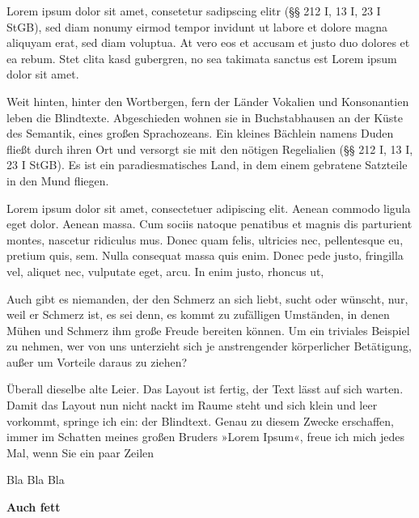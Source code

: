 \documentclass{jura}
\begin{document}
Lorem ipsum dolor sit amet, consetetur sadipscing elitr (§§ 212 I, 13 I, 23 I StGB), sed diam nonumy eirmod tempor invidunt ut labore et dolore magna aliquyam erat, sed diam voluptua. At vero eos et accusam et justo duo dolores et ea rebum. Stet clita kasd gubergren, no sea takimata sanctus est Lorem ipsum dolor sit amet.


Weit hinten, hinter den Wortbergen, fern der Länder Vokalien und Konsonantien leben die Blindtexte. Abgeschieden wohnen sie in Buchstabhausen an der Küste des Semantik, eines großen Sprachozeans. Ein kleines Bächlein namens Duden fließt durch ihren Ort und versorgt sie mit den nötigen Regelialien (§§ 212 I, 13 I, 23 I StGB). Es ist ein paradiesmatisches Land, in dem einem gebratene Satzteile in den Mund fliegen. 


Lorem ipsum dolor sit amet, consectetuer adipiscing elit. Aenean commodo ligula eget dolor. Aenean massa. Cum sociis natoque penatibus et magnis dis parturient montes, nascetur ridiculus mus. Donec quam felis, ultricies nec, pellentesque eu, pretium quis, sem. Nulla consequat massa quis enim. Donec pede justo, fringilla vel, aliquet nec, vulputate eget, arcu. In enim justo, rhoncus ut, 


Auch gibt es niemanden, der den Schmerz an sich liebt, sucht oder wünscht, nur, weil er Schmerz ist, es sei denn, es kommt zu zufälligen Umständen, in denen Mühen und Schmerz ihm große Freude bereiten können. Um ein triviales Beispiel zu nehmen, wer von uns unterzieht sich je anstrengender körperlicher Betätigung, außer um Vorteile daraus zu ziehen? 



Überall dieselbe alte Leier. Das Layout ist fertig, der Text lässt auf sich warten. Damit das Layout nun nicht nackt im Raume steht und sich klein und leer vorkommt, springe ich ein: der Blindtext. Genau zu diesem Zwecke erschaffen, immer im Schatten meines großen Bruders »Lorem Ipsum«, freue ich mich jedes Mal, wenn Sie ein paar Zeilen 



Bla Bla Bla

\textbf{Auch fett}
\end{document}
